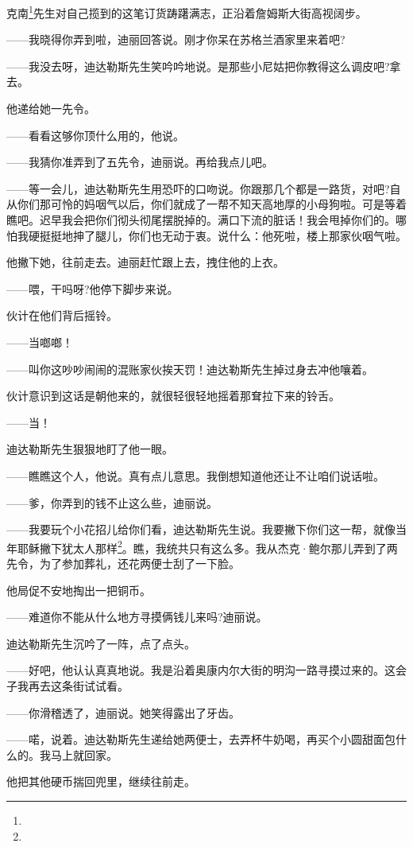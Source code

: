 \par 克南\footnote{}先生对自己揽到的这笔订货踌躇满志，正沿着詹姆斯大街高视阔步。
\par ——我晓得你弄到啦，迪丽回答说。刚才你呆在苏格兰酒家里来着吧?
\par ——我没去呀，迪达勒斯先生笑吟吟地说。是那些小尼姑把你教得这么调皮吧?拿去。
\par 他递给她一先令。
\par ——看看这够你顶什么用的，他说。
\par ——我猜你准弄到了五先令，迪丽说。再给我点儿吧。
\par ——等一会儿，迪达勒斯先生用恐吓的口吻说。你跟那几个都是一路货，对吧?自从你们那可怜的妈咽气以后，你们就成了一帮不知天高地厚的小母狗啦。可是等着瞧吧。迟早我会把你们彻头彻尾摆脱掉的。满口下流的脏话！我会甩掉你们的。哪怕我硬挺挺地抻了腿儿，你们也无动于衷。说什么：他死啦，楼上那家伙咽气啦。
\par 他撇下她，往前走去。迪丽赶忙跟上去，拽住他的上衣。
\par ——喂，干吗呀?他停下脚步来说。
\par 伙计在他们背后摇铃。
\par ——当啷啷！
\par ——叫你这吵吵闹闹的混账家伙挨天罚！迪达勒斯先生掉过身去冲他嚷着。
\par 伙计意识到这话是朝他来的，就很轻很轻地摇着那耷拉下来的铃舌。
\par ——当！
\par 迪达勒斯先生狠狠地盯了他一眼。
\par ——瞧瞧这个人，他说。真有点儿意思。我倒想知道他还让不让咱们说话啦。
\par ——爹，你弄到的钱不止这么些，迪丽说。
\par ——我要玩个小花招儿给你们看，迪达勒斯先生说。我要撇下你们这一帮，就像当年耶稣撇下犹太人那样\footnote{}。瞧，我统共只有这么多。我从杰克·鲍尔那儿弄到了两先令，为了参加葬礼，还花两便士刮了一下脸。
\par 他局促不安地掏出一把铜币。
\par ——难道你不能从什么地方寻摸俩钱儿来吗?迪丽说。
\par 迪达勒斯先生沉吟了一阵，点了点头。
\par ——好吧，他认认真真地说。我是沿着奥康内尔大街的明沟一路寻摸过来的。这会子我再去这条街试试看。
\par ——你滑稽透了，迪丽说。她笑得露出了牙齿。
\par ——喏，说着。迪达勒斯先生递给她两便士，去弄杯牛奶喝，再买个小圆甜面包什么的。我马上就回家。
\par 他把其他硬币揣回兜里，继续往前走。
